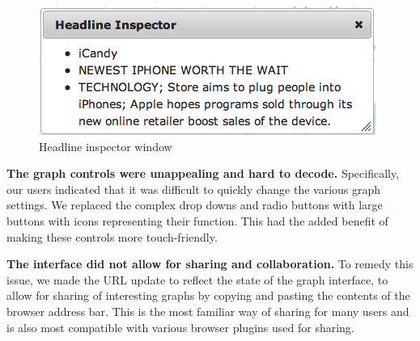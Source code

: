\begin{figure}[htb]
  \centerline{
    \includegraphics[scale=0.28]{figures/details.png}
  }
  \caption{Headline inspector window}
  \label{fig:details}
\end{figure}



\textbf{The graph controls were unappealing and hard to decode.} Specifically, our users indicated that it was difficult to quickly change the various graph settings. We replaced the complex drop downs and radio buttons with large buttons with icons representing their function. This had the added benefit of making these controls more touch-friendly.

\textbf{The interface did not allow for sharing and collaboration.} To remedy this issue, we made the URL update to reflect the state of the graph interface, to allow for sharing of interesting graphs by copying and pasting the contents of the browser address bar. This is the most familiar way of sharing for many users and is also most compatible with various browser plugins used for sharing.

